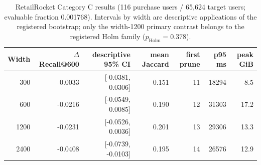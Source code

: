 \begin{table}[t]
\caption{RetailRocket Category C results (116 purchase users / 65,624 target users; evaluable fraction 0.001768). Intervals by width are descriptive applications of the registered bootstrap; only the width-1200 primary contrast belongs to the registered Holm family ($p_{\mathrm{Holm}}=0.378$).}
\label{tab:public-failure}
\centering\scriptsize
\begin{tabular}{rrrrrrr}
\toprule Width & $\Delta$ Recall@600 & descriptive 95\% CI & mean Jaccard & first prune & p95 ms & peak GiB \\ \midrule
300 & -0.0033 & [-0.0381, 0.0306] & 0.151 & 11 & 18294 & 8.5 \\
600 & -0.0216 & [-0.0549, 0.0085] & 0.190 & 12 & 31303 & 17.2 \\
1200 & -0.0231 & [-0.0526, 0.0036] & 0.201 & 13 & 29306 & 13.3 \\
2400 & -0.0408 & [-0.0739, -0.0103] & 0.195 & 14 & 26576 & 12.9 \\
\bottomrule\end{tabular}
\end{table}

